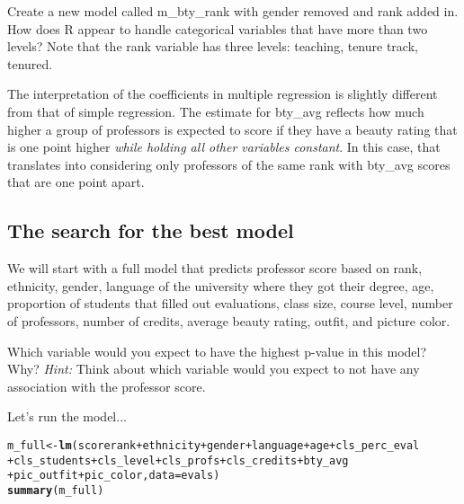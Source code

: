 \documentclass{article}\usepackage[]{graphicx}\usepackage[]{color}
\makeatletter
\newcommand{\hlopt}[1]{\textcolor[rgb]{0,0,0}{#1}}%
\newcommand{\hlstd}[1]{\textcolor[rgb]{0.345,0.345,0.345}{#1}}%
\newcommand{\hlkwb}[1]{\textcolor[rgb]{0.69,0.353,0.396}{#1}}%
\newcommand{\hlkwc}[1]{\textcolor[rgb]{0.333,0.667,0.333}{#1}}%
\newcommand{\hlkwd}[1]{\textcolor[rgb]{0.737,0.353,0.396}{\textbf{#1}}}%
\newenvironment{kframe}{%
 \def\at@end@of@kframe{}%
 \ifinner\ifhmode%
  \def\at@end@of@kframe{\end{minipage}}%
  \begin{minipage}{\columnwidth}%
 \fi\fi%
 \def\FrameCommand##1{\hskip\@totalleftmargin \hskip-\fboxsep
 \colorbox{shadecolor}{##1}\hskip-\fboxsep
     \hskip-\linewidth \hskip-\@totalleftmargin \hskip\columnwidth}%
 \MakeFramed {\advance\hsize-\width
   \@totalleftmargin\z@ \linewidth\hsize
   \@setminipage}}%
 {\par\unskip\endMakeFramed%
 \at@end@of@kframe}
\newenvironment{knitrout}{}{} %
\makeatother
\begin{document}
\begin{exercise}
Create a new model called \hlstd{m\_bty\_rank} with \hlstd{gender} removed and \hlstd{rank} added in.  How does R appear to handle categorical variables that have more than two levels? Note that the rank variable has three levels: teaching, tenure track, tenured.
\end{exercise}

The interpretation of the coefficients in multiple regression is slightly different from that of simple regression.  The estimate for \hlstd{bty\_avg} reflects how much higher a group of professors is expected to score if they have a beauty rating that is one point higher \emph{while holding all other variables constant}.  In this case, that translates into considering only professors of the same rank with \hlstd{bty\_avg} scores that are one point apart.

\subsection*{The search for the best model}

We will start with a full model that predicts professor score based on rank, ethnicity, gender, language of the university where they got their degree, age, proportion of students that filled out evaluations, class size, course level, number of professors, number of credits, average beauty rating, outfit, and picture color.

\begin{exercise}
Which variable would you expect to have the highest p-value in this model? Why? \textit{Hint:} Think about which variable would you expect to not have any association with the professor score.
\end{exercise}

Let's run the model...

\begin{knitrout}
\color{fgcolor}\begin{kframe}
\begin{alltt}
\hlstd{m_full} \hlkwb{<-} \hlkwd{lm}\hlstd{(score} \hlopt{\mytilde} \hlstd{rank} \hlopt{+} \hlstd{ethnicity} \hlopt{+} \hlstd{gender} \hlopt{+} \hlstd{language} \hlopt{+} \hlstd{age} \hlopt{+} \hlstd{cls_perc_eval}
             \hlopt{+} \hlstd{cls_students} \hlopt{+} \hlstd{cls_level} \hlopt{+} \hlstd{cls_profs} \hlopt{+} \hlstd{cls_credits} \hlopt{+} \hlstd{bty_avg}
             \hlopt{+} \hlstd{pic_outfit} \hlopt{+} \hlstd{pic_color,} \hlkwc{data} \hlstd{= evals)}
\hlkwd{summary}\hlstd{(m_full)}
\end{alltt}
\end{kframe}
\end{knitrout}
\end{document}

